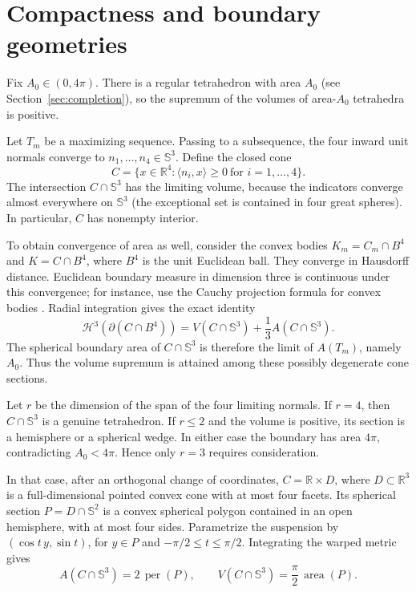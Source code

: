 \documentclass[11pt,reqno]{amsart}
\theoremstyle{remark}
\DeclareMathOperator{\area}{area}
\newcommand{\Sph}{\mathbb S}
\newcommand{\R}{\mathbb R}
\newcommand{\ip}[2]{\langle #1,#2\rangle}
\begin{document}
\section{Compactness and boundary geometries}\label{sec:boundary}

Fix $A_0\in(0,4\pi)$. There is a regular tetrahedron with area $A_0$ (see Section~\ref{sec:completion}), so the supremum of the volumes of area-$A_0$ tetrahedra is positive.

Let $T_m$ be a maximizing sequence. Passing to a subsequence, the four inward unit normals converge to $n_1,\ldots,n_4\in\Sph^3$. Define the closed cone
\begin{equation}\label{eq:cone}
 C=\{x\in\R^4:\ip{n_i}{x}\ge0\ \text{for }i=1,\ldots,4\}.
\end{equation}
The intersection $C\cap\Sph^3$ has the limiting volume, because the indicators converge almost everywhere on $\Sph^3$ (the exceptional set is contained in four great spheres). In particular, $C$ has nonempty interior.

To obtain convergence of area as well, consider the convex bodies $K_m=C_m\cap B^4$ and $K=C\cap B^4$, where $B^4$ is the unit Euclidean ball. They converge in Hausdorff distance. Euclidean boundary measure in dimension three is continuous under this convergence; for instance, use the Cauchy projection formula for convex bodies \cite{Schneider}. Radial integration gives the exact identity
\begin{equation}\label{eq:radial-area}
 \mathcal H^3(\partial(C\cap B^4))
 =V(C\cap\Sph^3)+\frac13A(C\cap\Sph^3).
\end{equation}
The spherical boundary area of $C\cap\Sph^3$ is therefore the limit of $A(T_m)$, namely $A_0$. Thus the volume supremum is attained among these possibly degenerate cone sections.

Let $r$ be the dimension of the span of the four limiting normals. If $r=4$, then $C\cap\Sph^3$ is a genuine tetrahedron. If $r\le2$ and the volume is positive, its section is a hemisphere or a spherical wedge. In either case the boundary has area $4\pi$, contradicting $A_0<4\pi$. Hence only $r=3$ requires consideration.

In that case, after an orthogonal change of coordinates, $C=\R\times D$, where $D\subset\R^3$ is a full-dimensional pointed convex cone with at most four facets. Its spherical section $P=D\cap\Sph^2$ is a convex spherical polygon contained in an open hemisphere, with at most four sides. Parametrize the suspension by $(\cos t\,y,\sin t)$, for $y\in P$ and $-\pi/2\le t\le\pi/2$. Integrating the warped metric gives
\begin{equation}\label{eq:suspension}
 A(C\cap\Sph^3)=2\,\operatorname{per}(P),
 \qquad V(C\cap\Sph^3)=\frac\pi2\,\area(P).
\end{equation}
\end{document}
